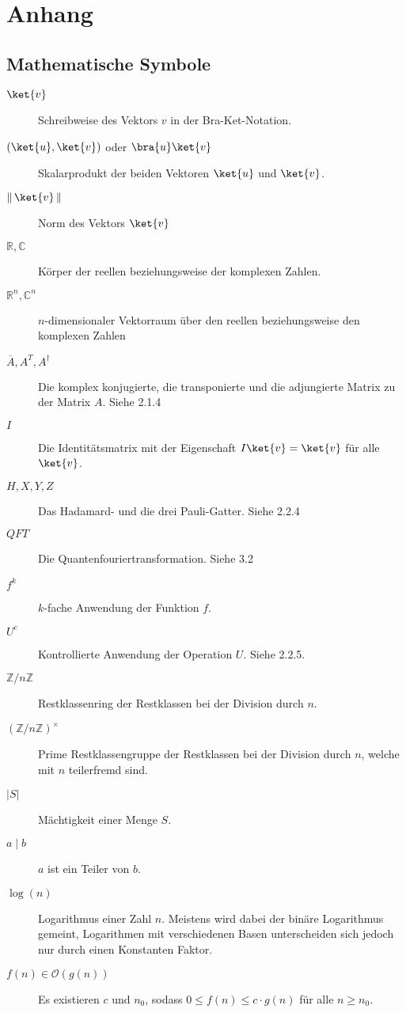 \chapter{Anhang}
\section{Mathematische Symbole}
\begin{description}
    \item[$\ket{v}$] Schreibweise des Vektors $v$ in der Bra-Ket-Notation.
    \item[$(\ket{u}, \ket{v})$ oder $\bra{u}\ket{v}$] Skalarprodukt der beiden Vektoren $\ket{u}$ und $\ket{v}$.
    \item[$\left\|\, \ket{v}\, \right\|$] Norm des Vektors $\ket{v}$
    \item[$\mathbb{R}, \mathbb{C}$] Körper der reellen beziehungsweise der komplexen Zahlen.
    \item[$\mathbb{R}^n, \mathbb{C}^n$] $n$-dimensionaler Vektorraum über den reellen beziehungsweise den komplexen Zahlen
    \item[$\overline{A}, A^T, A^\dagger$] Die komplex konjugierte, die transponierte und die adjungierte Matrix zu der Matrix $A$. Siehe 2.1.4
    \item[$I$] Die Identitätsmatrix mit der Eigenschaft $I\ket{v} = \ket{v}$ für alle $\ket{v}$. 
    \item[$H, X, Y, Z$] Das Hadamard- und die drei Pauli-Gatter. Siehe 2.2.4
    \item[$QFT$] Die Quantenfouriertransformation. Siehe 3.2
    \item[$f^k$] $k$-fache Anwendung der Funktion $f$.
    \item[$U^c$] Kontrollierte Anwendung der Operation $U$. Siehe 2.2.5.
    \item[$\mathbb{Z} / n \mathbb{Z}$] Restklassenring der Restklassen bei der Division durch $n$. 
    \item[$(\mathbb {Z}/n\mathbb {Z} )^{\times}$] Prime Restklassengruppe der Restklassen bei der Division durch $n$, welche mit $n$ teilerfremd sind.
    \item[$|S|$] Mächtigkeit einer Menge $S$.
    \item[$a \mid b$] $a$ ist ein Teiler von $b$.
    \item[$\log(n)$] Logarithmus einer Zahl $n$. Meistens wird dabei der binäre Logarithmus gemeint, Logarithmen mit verschiedenen Basen unterscheiden sich jedoch nur durch einen Konstanten Faktor.
    \item[$f(n) \in \mathcal O(g(n))$] Es existieren $c$ und $n_0$, sodass $0 \leq f(n) \leq c\cdot g(n)$ für alle $n\geq n_0$.
\end{description}
\pagebreak
